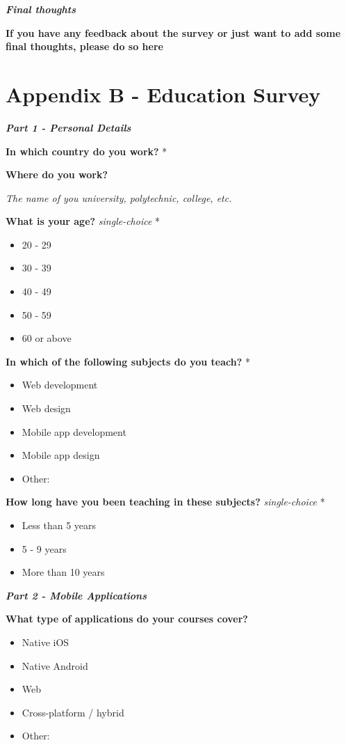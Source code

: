 \documentclass[a4paper,12pt]{article}
\begin{document}
\quad

\textbf{\textit{Final thoughts}}

\textbf{If you have any feedback about the survey or just want to add some final thoughts, please do so here}

\newpage
\section{Appendix B - Education Survey} 
\textbf{\textit{Part 1 - Personal Details}}

\textbf{In which country do you work?} *

\quad

\textbf{Where do you work?}

\textit{The name of you university, polytechnic, college, etc.}

\quad

\textbf{What is your age?}  \textit{single-choice} *
\begin{itemize}
    \item 20 - 29
    \item 30 - 39
    \item 40 - 49
    \item 50 - 59
    \item 60 or above
\end{itemize}


\textbf{In which of the following subjects do you teach?} *
\begin{itemize}
    \item Web development
    \item Web design
    \item Mobile app development
    \item Mobile app design
    \item Other:
\end{itemize}

\textbf{How long have you been teaching in these subjects?} \textit{single-choice} *
\begin{itemize}
    \item Less than 5 years
    \item 5 - 9 years
    \item More than 10 years
\end{itemize}

\quad

\quad

\textbf{\textit{Part 2 - Mobile Applications}}

\textbf{What type of applications do your courses cover?}
\begin{itemize}
    \item Native iOS
    \item Native Android
    \item Web
    \item Cross-platform / hybrid
    \item Other: 
\end{itemize}
\end{document}
